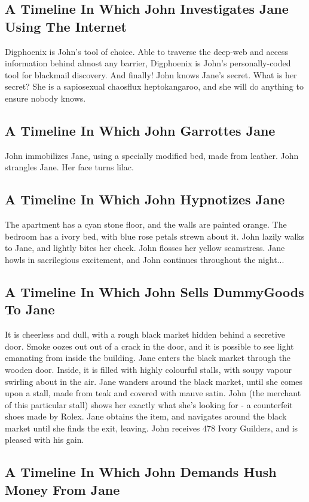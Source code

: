 \documentclass{article}
\begin{document}
\subsection{A Timeline In Which John Investigates Jane Using The Internet}


Digphoenix is John's tool of choice. Able to traverse the deep{-}web and access information behind almost any barrier, Digphoenix is John's personally{-}coded tool for blackmail discovery.
And finally!
John knows Jane's secret. What is her secret? She is a sapiosexual chaosflux heptokangaroo, and she will do anything to ensure nobody knows.
\subsection{A Timeline In Which John Garrottes Jane}


John immobilizes Jane, using a specially modified bed, made from leather.
John strangles Jane.
Her face turns lilac.
\subsection{A Timeline In Which John Hypnotizes Jane}


The apartment has a cyan stone floor, and the walls are painted orange.
The bedroom has a ivory bed, with blue rose petals strewn about it.
John lazily walks to Jane, and lightly bites her cheek.
John flosses her yellow seamstress.
Jane howls in sacrilegious excitement, and John continues throughout the night...
\subsection{A Timeline In Which John Sells DummyGoods To Jane}


It is cheerless and dull, with a rough black market hidden behind a secretive door.
Smoke oozes out out of a crack in the door, and it is possible to see light emanating from inside the building.
Jane enters the black market through the wooden door.
Inside, it is filled with highly colourful stalls, with soupy vapour swirling about in the air.
Jane wanders around the black market, until she comes upon a stall, made from teak and covered with mauve satin.
John (the merchant of this particular stall) shows her exactly what she's looking for {-} a counterfeit shoes made by Rolex.
Jane obtains the item, and navigates around the black market until she finds the exit, leaving.
John receives 478 Ivory Guilders, and is pleased with his gain.
\subsection{A Timeline In Which John Demands Hush Money From Jane}
\end{document}
